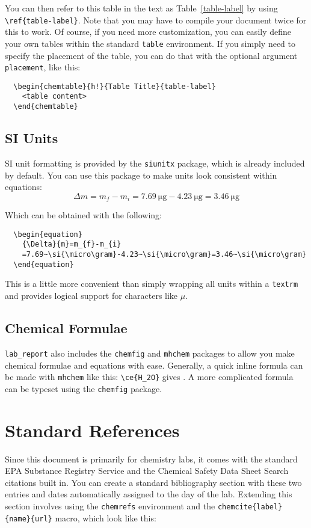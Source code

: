\documentclass{lab_report}
\begin{document}
You can then refer to this table in the text as Table~\ref{table-label} by using \verb|\ref{table-label}|. Note that you may have to compile your document twice for this to work.
Of course, if you need more customization, you can easily define your own tables within the standard \verb|table| environment. If you simply need to specify the placement of the table, you can do that with the optional argument \verb|placement|, like this:
\begin{verbatim}
  \begin{chemtable}{h!}{Table Title}{table-label}
    <table content>
  \end{chemtable}
\end{verbatim}

\subsection{SI Units}
SI unit formatting is provided by the \verb|siunitx| package, which is already included by default. You can use this package to make units look consistent within equations:
\begin{equation}
  {\Delta}{m}=m_{f}-m_{i}=7.69~\si{\micro\gram}-4.23~\si{\micro\gram}=3.46~\si{\micro\gram}
\end{equation}

Which can be obtained with the following:
\begin{verbatim}
  \begin{equation}
    {\Delta}{m}=m_{f}-m_{i}
    =7.69~\si{\micro\gram}-4.23~\si{\micro\gram}=3.46~\si{\micro\gram}
  \end{equation}
\end{verbatim}

This is a little more convenient than simply wrapping all units within a \verb|textrm| and provides logical support for characters like $\mu$.

\subsection{Chemical Formulae}
\verb|lab_report| also includes the \verb|chemfig| and \verb|mhchem| packages to allow you make chemical formulae and equations with ease. Generally, a quick inline formula can be made with \verb|mhchem| like this: \verb|\ce{H_2O}| gives . A more complicated formula can be typeset using the \verb|chemfig| package.

\section{Standard References}
Since this document is primarily for chemistry labs, it comes with the standard EPA Substance Registry Service and the Chemical Safety Data Sheet Search citations built in. You can create a standard bibliography section with these two entries and dates automatically assigned to the day of the lab. Extending this section involves using the \verb|chemrefs| environment and the \verb|chemcite{label}{name}{url}| macro, which look like this:
\end{document}
